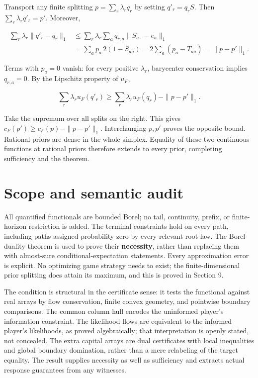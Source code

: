 \documentclass[11pt,a4paper]{article}
\begin{document}
Transport any finite splitting \(p=\sum_r\lambda_rq_r\) by setting \(q'_r=q_r S\). Then \(\sum_r\lambda_rq'_r=p'\). Moreover,

\[
\begin{aligned}
\sum_r\lambda_r\|q'_r-q_r\|_1
&\le\sum_r\lambda_r\sum_aq_{r,a}\|S_{a\cdot}-e_a\|_1\\
&=\sum_ap_a\,2(1-S_{aa})
=2\sum_a(p_a-T_{aa})=\|p-p'\|_1.
\end{aligned}
\]

Terms with \(p_a=0\) vanish: for every positive \(\lambda_r\), barycenter conservation implies \(q_{r,a}=0\). By the Lipschitz property of \(u_F\),

\[
\sum_r\lambda_ru_F(q'_r)
\ge\sum_r\lambda_ru_F(q_r)-\|p-p'\|_1.
\]

Take the supremum over all splits on the right. This gives \(c_F(p')\ge c_F(p)-\|p-p'\|_1\). Interchanging \(p,p'\) proves the opposite bound. Rational priors are dense in the whole simplex. Equality of these two continuous functions at rational priors therefore extends to every prior, completing sufficiency and the theorem.

\section{Scope and semantic audit}

All quantified functionals are bounded Borel; no tail, continuity, prefix, or finite-horizon restriction is added. The terminal constraints hold on every path, including paths assigned probability zero by every relevant root law. The Borel duality theorem is used to prove their \textbf{necessity}, rather than replacing them with almost-sure conditional-expectation statements. Every approximation error is explicit. No optimizing game strategy needs to exist; the finite-dimensional prior splitting does attain its maximum, and this is proved in Section 9.

The condition is structural in the certificate sense: it tests the functional against real arrays by flow conservation, finite convex geometry, and pointwise boundary comparisons. The common column hull encodes the uninformed player's information constraint. The likelihood flows are equivalent to the informed player's likelihoods, as proved algebraically; that interpretation is openly stated, not concealed. The extra capital arrays are dual certificates with local inequalities and global boundary domination, rather than a mere relabeling of the target equality. The result supplies necessity as well as sufficiency and extracts actual response guarantees from any witnesses.
\end{document}
